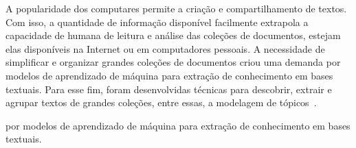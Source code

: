 
















A popularidade dos computares permite a criação e compartilhamento de textos. Com isso, a quantidade de informação disponível facilmente extrapola a capacidade de humana de leitura e análise das coleções de documentos, estejam elas disponíveis na Internet ou em computadores pessoais. A necessidade de simplificar e organizar grandes coleções de documentos criou uma demanda por modelos de aprendizado de máquina para extração de conhecimento em bases textuais. Para esse fim, foram desenvolvidas técnicas para descobrir, extrair e agrupar textos de grandes coleções, entre essas, a modelagem de tópicos~\cite{Hofmann1999,Deerwester1990,Lee1999,Blei2012}.  %






por modelos de aprendizado de máquina para extração de conhecimento em bases textuais. 



























